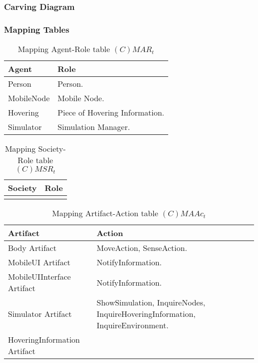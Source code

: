 \subsubsection{Carving Diagram}


\subsubsection{Mapping Tables}

\begin{table}[H]
	\centering
	\begin{tabular}{|p{4cm}|p{8cm}|}
			\hline
			\textbf{Agent} & \textbf{Role} \\
			\hline
			Person & Person. \\
			\hline
			MobileNode & Mobile Node.  \\
			\hline
			Hovering & Piece of Hovering Information. \\
			\hline
			Simulator & Simulation Manager. \\
			\hline
		\end{tabular}
	\caption{Mapping Agent-Role table $(C)MAR_t$}
	\label{tab:cmart}
\end{table}

\begin{table}[H]
	\centering
	\begin{tabular}{|p{4cm}|p{8cm}|}
			\hline
			\textbf{Society} & \textbf{Role} \\
			\hline
			& \\
			\hline
		\end{tabular}
	\caption{Mapping Society-Role table $(C)MSR_t$}
	\label{tab:cmsrt}
\end{table}

\begin{table}[H]
	\centering
	\begin{tabular}{|p{4cm}|p{8cm}|}
			\hline
			\textbf{Artifact} & \textbf{Action} \\
			\hline
			Body Artifact & MoveAction, SenseAction. \\
			\hline
			MobileUI Artifact & NotifyInformation. \\
			\hline
			MobileUIInterface Artifact & NotifyInformation. \\
			\hline
      Simulator Artifact & ShowSimulation, InquireNodes,
      InquireHoveringInformation, InquireEnvironment. \\
			\hline
			HoveringInformation Artifact & \\
			\hline
		\end{tabular}
	\caption{Mapping Artifact-Action table $(C)MAAc_t$}
	\label{tab:cmaact}
\end{table}

